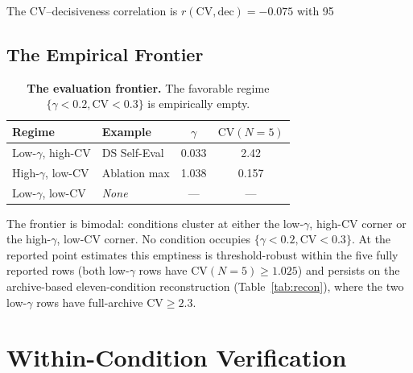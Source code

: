 \documentclass[11pt]{article}
\begin{document}
The $\mathrm{CV}$--decisiveness correlation is $r(\mathrm{CV}, \text{dec}) = -0.075$ with 95%

\subsection{The Empirical Frontier}

\begin{table}[t]
\centering
\caption{\textbf{The evaluation frontier.} The favorable regime $\{\gamma < 0.2, \mathrm{CV} < 0.3\}$ is empirically empty.}
\label{tab:frontier}
\begin{tabular}{@{}llcc@{}}
\toprule
Regime & Example & $\gamma$ & $\mathrm{CV}(N{=}5)$ \\
\midrule
Low-$\gamma$, high-CV & DS Self-Eval & 0.033 & 2.42 \\
High-$\gamma$, low-CV & Ablation max & 1.038 & 0.157 \\
\midrule
Low-$\gamma$, low-CV & \textit{None} & --- & --- \\
\bottomrule
\end{tabular}
\end{table}

The frontier is bimodal: conditions cluster at either the low-$\gamma$, high-CV corner or the high-$\gamma$, low-CV corner. No condition occupies $\{\gamma < 0.2, \mathrm{CV} < 0.3\}$. At the reported point estimates this emptiness is threshold-robust within the five fully reported rows (both low-$\gamma$ rows have $\mathrm{CV}(N{=}5) \geq 1.025$) and persists on the archive-based eleven-condition reconstruction (Table~\ref{tab:recon}), where the two low-$\gamma$ rows have full-archive $\mathrm{CV} \geq 2.3$.

\section{Within-Condition Verification}
\end{document}
